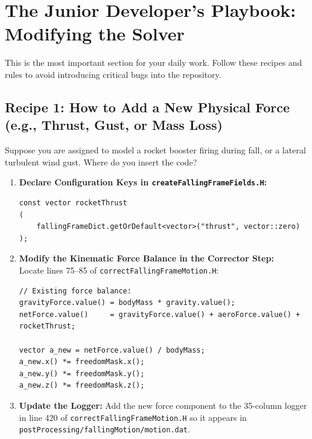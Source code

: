 \documentclass[11pt,a4paper]{article}
\begin{document}
\section{The Junior Developer's Playbook: Modifying the Solver}

This is the most important section for your daily work. Follow these recipes and rules to avoid introducing critical bugs into the repository.

\subsection{Recipe 1: How to Add a New Physical Force (e.g., Thrust, Gust, or Mass Loss)}
Suppose you are assigned to model a rocket booster firing during fall, or a lateral turbulent wind gust.
Where do you insert the code?

\begin{enumerate}
    \item \textbf{Declare Configuration Keys in \texttt{createFallingFrameFields.H}:}
\begin{lstlisting}
const vector rocketThrust
(
    fallingFrameDict.getOrDefault<vector>("thrust", vector::zero)
);
\end{lstlisting}
    
    \item \textbf{Modify the Kinematic Force Balance in the Corrector Step:}\\
    Locate lines 75--85 of \texttt{correctFallingFrameMotion.H}:
\begin{lstlisting}
// Existing force balance:
gravityForce.value() = bodyMass * gravity.value();
netForce.value()     = gravityForce.value() + aeroForce.value() + rocketThrust;

vector a_new = netForce.value() / bodyMass;
a_new.x() *= freedomMask.x();
a_new.y() *= freedomMask.y();
a_new.z() *= freedomMask.z();
\end{lstlisting}

    \item \textbf{Update the Logger:} 
    Add the new force component to the 35-column logger in line 420 of \texttt{correctFallingFrameMotion.H} so it appears in \texttt{postProcessing/fallingMotion/motion.dat}.
\end{enumerate}
\end{document}
